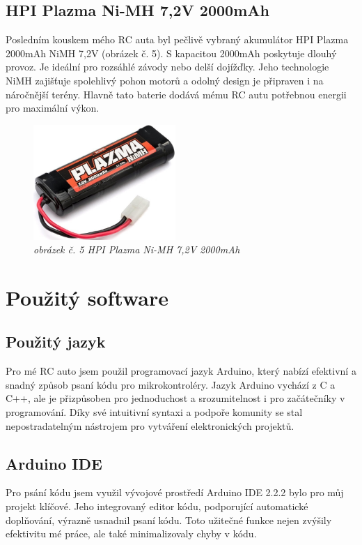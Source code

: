 \documentclass[12pt, a4paper,
oneside,      %
openany
]{report}
\begin{document}
\subsection{HPI Plazma Ni-MH 7,2V 2000mAh}
\noindent Posledním kouskem mého RC auta byl pečlivě vybraný akumulátor HPI Plazma 2000mAh NiMH 7,2V (obrázek č. 5). S kapacitou 2000mAh poskytuje dlouhý provoz. Je ideální pro rozsáhlé závody nebo delší dojížďky. Jeho technologie NiMH zajišťuje spolehlivý pohon motorů a odolný design je připraven i na náročnější terény. Hlavně tato baterie dodává mému RC autu potřebnou energii pro maximální výkon.
\begin{figure}[H]
        \centering
		\includegraphics[width=0.48\textwidth]{image/akumulator.png}
        \caption*{\textit{obrázek č. 5 HPI Plazma Ni-MH 7,2V 2000mAh}}
        \label{fig:akumulator}
    \end{figure}

\section{Použitý software}
\subsection{Použitý jazyk}
\noindent Pro mé RC auto jsem použil programovací jazyk Arduino, který nabízí efektivní a snadný způsob psaní kódu pro mikrokontroléry. Jazyk Arduino vychází z C a C++, ale je přizpůsoben pro jednoduchost a srozumitelnost i pro začátečníky v programování. Díky své intuitivní syntaxi a podpoře komunity se stal nepostradatelným nástrojem pro vytváření elektronických projektů.

\subsection{Arduino IDE}
\noindent Pro psání kódu jsem využil vývojové prostředí Arduino IDE 2.2.2 bylo pro můj projekt klíčové. Jeho integrovaný editor kódu, podporující automatické doplňování, výrazně usnadnil psaní kódu. Toto užitečné funkce nejen zvýšily efektivitu mé práce, ale také minimalizovaly chyby v kódu. 
\end{document}
